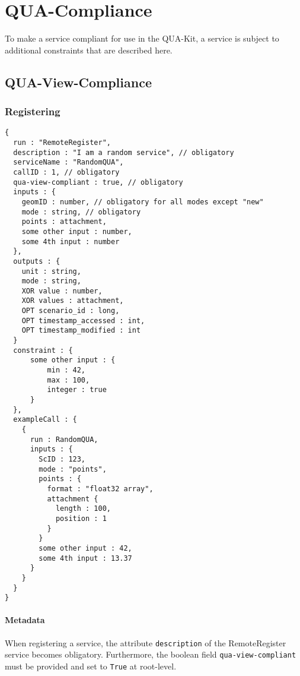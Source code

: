 \section{QUA-Compliance}
\label{ch:quacompliance}

To make a service compliant for use in the QUA-Kit, a service is subject to additional constraints that are described here.

\subsection{QUA-View-Compliance}

\subsubsection{Registering}

\begin{lstlisting}[caption={Registering a QUA-compliant service}, label={lst:quacompliance}]
{
  run : "RemoteRegister",
  description : "I am a random service", // obligatory
  serviceName : "RandomQUA",
  callID : 1, // obligatory
  qua-view-compliant : true, // obligatory
  inputs : {
    geomID : number, // obligatory for all modes except "new"
    mode : string, // obligatory
    points : attachment,
    some other input : number,
    some 4th input : number
  },
  outputs : {
    unit : string,
    mode : string,
    XOR value : number,
    XOR values : attachment,
    OPT scenario_id : long,
    OPT timestamp_accessed : int,
    OPT timestamp_modified : int
  }
  constraint : {
      some other input : {
          min : 42,
          max : 100,
          integer : true
      }
  },
  exampleCall : {
    {
      run : RandomQUA,
      inputs : {
        ScID : 123,
        mode : "points",
        points : {
          format : "float32 array",
          attachment {
            length : 100,
            position : 1
          }
        }
        some other input : 42,
        some 4th input : 13.37
      }
    }
  }
}
\end{lstlisting}

\paragraph{Metadata}
When registering a service, the attribute \texttt{description} of the RemoteRegister service becomes obligatory. Furthermore, the boolean field \texttt{qua-view-compliant} must be provided and set to \texttt{True} at root-level.

